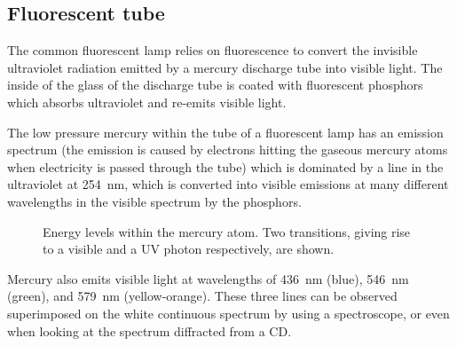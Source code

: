 \subsection{Fluorescent tube}
The common fluorescent lamp relies on fluorescence to convert the invisible ultraviolet radiation emitted by a mercury discharge tube into visible light.  The inside of the glass of the discharge tube is coated with fluorescent phosphors which absorbs ultraviolet and re-emits visible light.

The low pressure mercury within the tube of a fluorescent lamp has an emission spectrum (the emission is caused by electrons hitting the gaseous mercury atoms when electricity is passed through the tube) which is dominated by a line in the ultraviolet at \SI{254}{nm}, which is converted into visible emissions at many different wavelengths in the visible spectrum by the phosphors.

\begin{figure}
\caption{Energy levels within the mercury atom.  Two transitions, giving rise to a visible and a UV photon respectively, are shown.}
\end{figure}

Mercury also emits visible light at wavelengths of \SI{436}{nm} (blue), \SI{546}{nm} (green), and \SI{579}{nm} (yellow-orange).  These three lines can be observed superimposed on the white continuous spectrum by using a spectroscope, or even when looking at the spectrum diffracted from a CD.

